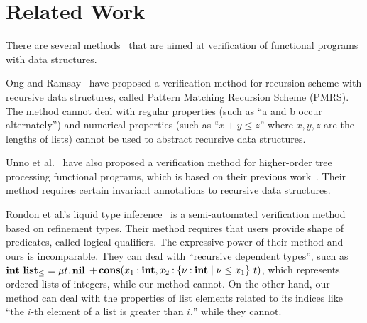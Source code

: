 \section{Related Work}
\label{sec:related}

There are several
methods~\cite{Ong2011,Kobayashi2010,Unno2010,Rondon2008,Kawaguchi2009,Chin2003}
that are aimed at verification of functional programs with data
structures.

Ong and Ramsay~\cite{Ong2011} have proposed a verification method for
recursion scheme with recursive data structures, called Pattern Matching
Recursion Scheme (PMRS).  The method cannot deal with regular properties
(such as ``a and b occur alternately'') and numerical properties (such
as ``$x+y \leq z$'' where $x,y,z$ are the lengths of lists) cannot be
used to abstract recursive data structures.

Unno et al.~\cite{Unno2010} have also proposed a verification method for
higher-order tree processing functional programs, which is based on
their previous work~\cite{Kobayashi2010}. Their method requires certain
invariant annotations to recursive data structures.

Rondon et al.'s liquid type inference~\cite{Rondon2008,Kawaguchi2009} is a
semi-automated verification method based on refinement types.  Their method requires
that users provide shape of predicates, called logical qualifiers.  The
expressive power of their method and ours is incomparable.  They can
deal with ``recursive dependent types'', such as ${\mathbf{int}}~{\mathbf{list}_\leq}
= \mu t.\, \mathbf{nil}$ $\mathop{+}
\mathbf{cons}({x_1\mathbin{:}\mathbf{int}},{x_2\mathbin{:}{\{\nu\mathbin{:}\mathbf{int} \mid \nu \leq x_1\}}~{t}})$,
which represents ordered lists of integers, while our method cannot. On
the other hand, our method can deal with the properties of list elements
related to its indices like ``the $i$-th element of a list is greater
than $i$,'' while they cannot.

